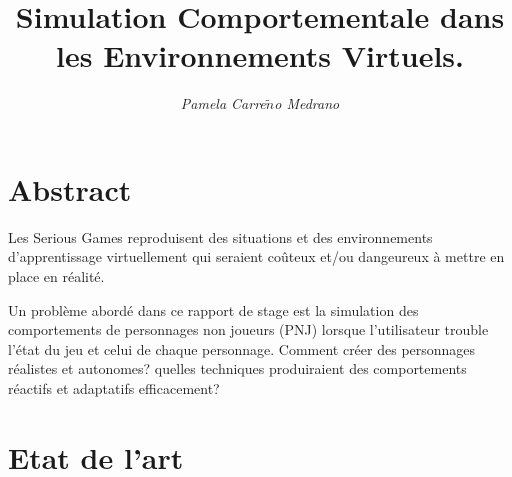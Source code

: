 \documentclass[11pt]{article}
\title{Simulation Comportementale dans les Environnements Virtuels.}
\author{\textit{Pamela Carre$\tilde{n}$o Medrano}}
\date{
	\begin{center}
		Master Thesis \\
		Equipe Vortex - ENI Brest IRIT - Université de Toulouse \\
		Année 2012
	\end{center}
}
\begin{document}
\maketitle
\section*{Abstract}


Les Serious Games reproduisent des situations et des environnements d'apprentissage virtuellement qui seraient coûteux et/ou dangeureux à mettre en place en réalité.

Un problème abordé dans ce rapport de stage est la simulation des comportements de personnages non joueurs (PNJ) lorsque l'utilisateur trouble l'état du jeu et celui de chaque personnage. Comment créer des personnages réalistes et autonomes? quelles techniques produiraient des comportements réactifs et adaptatifs efficacement?

\section{Etat de l'art}
\end{document}
